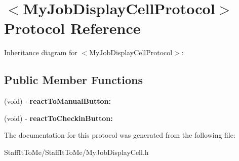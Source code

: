 \hypertarget{protocol_my_job_display_cell_protocol-p}{
\section{$<$\-My\-Job\-Display\-Cell\-Protocol$>$ \-Protocol \-Reference}
\label{protocol_my_job_display_cell_protocol-p}
}


\-Inheritance diagram for $<$\-My\-Job\-Display\-Cell\-Protocol$>$\-:
\subsection*{\-Public \-Member \-Functions}
\begin{DoxyCompactItemize}
\item 
\hypertarget{protocol_my_job_display_cell_protocol-p_abd51cbb451bd399a0c996fee1bc1bdc7}{
(void) -\/ {\bfseries react\-To\-Manual\-Button\-:}}
\label{protocol_my_job_display_cell_protocol-p_abd51cbb451bd399a0c996fee1bc1bdc7}

\item 
\hypertarget{protocol_my_job_display_cell_protocol-p_a802d05161122649e527b342271f086bb}{
(void) -\/ {\bfseries react\-To\-Checkin\-Button\-:}}
\label{protocol_my_job_display_cell_protocol-p_a802d05161122649e527b342271f086bb}

\end{DoxyCompactItemize}


\-The documentation for this protocol was generated from the following file\-:\begin{DoxyCompactItemize}
\item 
\-Staff\-It\-To\-Me/\-Staff\-It\-To\-Me/\-My\-Job\-Display\-Cell.\-h\end{DoxyCompactItemize}
